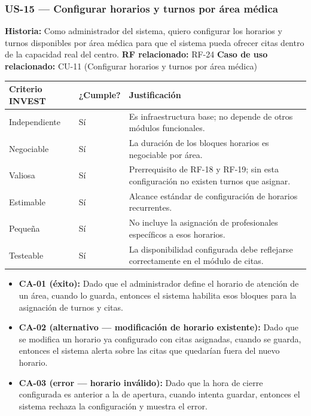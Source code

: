 \documentclass[11pt,a4paper]{article}
\providecommand{\tightlist}{%
	\setlength{\itemsep}{0pt}\setlength{\parskip}{0pt}}
\begin{document}
	\subsubsection{US-15 --- Configurar horarios y turnos por área médica}
	
	\textbf{Historia:} Como administrador del sistema, quiero configurar los horarios y turnos disponibles por área médica para que el sistema pueda ofrecer citas dentro de la capacidad real del centro.
	\textbf{RF relacionado:} RF-24
	\textbf{Caso de uso relacionado:} CU-11 (Configurar horarios y turnos por área médica)
	
	\begin{longtable}{p{} p{} p{}}
		
		
		\toprule
		\textbf{Criterio INVEST} &
		\textbf{¿Cumple?} &
		\textbf{Justificación} \\
		\midrule
		\endhead
		
		Independiente & Sí & Es infraestructura base; no depende de otros módulos funcionales. \\
		Negociable & Sí & La duración de los bloques horarios es negociable por área. \\
		Valiosa & Sí & Prerrequisito de RF-18 y RF-19; sin esta configuración no existen turnos que asignar. \\
		Estimable & Sí & Alcance estándar de configuración de horarios recurrentes. \\
		Pequeña & Sí & No incluye la asignación de profesionales específicos a esos horarios. \\
		Testeable & Sí & La disponibilidad configurada debe reflejarse correctamente en el módulo de citas. \\
		\bottomrule
	\end{longtable}
	
	\begin{itemize}
		\tightlist
		\item
		\textbf{CA-01 (éxito):} Dado que el administrador define el horario de atención de un área, cuando lo guarda, entonces el sistema habilita esos bloques para la asignación de turnos y citas.
		\item
		\textbf{CA-02 (alternativo --- modificación de horario existente):} Dado que se modifica un horario ya configurado con citas asignadas, cuando se guarda, entonces el sistema alerta sobre las citas que quedarían fuera del nuevo horario.
		\item
		\textbf{CA-03 (error --- horario inválido):} Dado que la hora de cierre configurada es anterior a la de apertura, cuando intenta guardar, entonces el sistema rechaza la configuración y muestra el error.
	\end{itemize}
	
\end{document}
